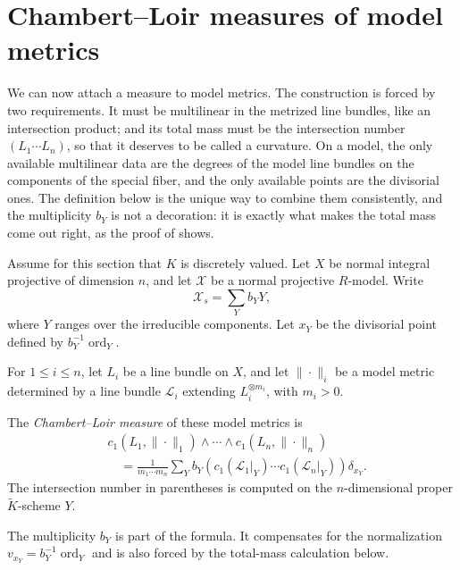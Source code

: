 \section{Chambert--Loir measures of model metrics}
\label{sec:metrics-cl-measure}

We can now attach a measure to model metrics. The construction is forced by
two requirements. It must be multilinear in the metrized line bundles, like
an intersection product; and its total mass must be the intersection number
$(L_1\cdots L_n)$, so that it deserves to be called a curvature. On a
model, the only available multilinear data are the degrees of the model line
bundles on the components of the special fiber, and the only available
points are the divisorial ones. The definition below is the unique way to
combine them consistently, and the multiplicity $b_Y$ is not a decoration:
it is exactly what makes the total mass come out right, as the proof of
 shows.

Assume for this section that $K$ is discretely valued. Let $X$ be
normal integral projective of dimension $n$, and let $\mathcal X$ be a normal
projective $R$-model. Write
\[
                        \mathcal X_s=\sum_Y b_YY,
\]
where $Y$ ranges over the irreducible components. Let $x_Y$ be the
divisorial point defined by $b_Y^{-1}\operatorname{ord}_Y$.

For $1\leq i\leq n$, let $L_i$ be a line bundle on $X$, and let
$\|\cdot\|_i$ be a model metric determined by a line bundle
$\mathcal L_i$ extending $L_i^{\otimes m_i}$, with $m_i>0$.

\begin{definition}
\label{def:metrics-mixed-model-measure}
The \emph{Chambert--Loir measure} of these model metrics is
\[
\begin{split}
 &c_1(L_1,\|\cdot\|_1)\wedge\cdots\wedge
                 c_1(L_n,\|\cdot\|_n)\\
 &\quad =
 \frac{1}{m_1\cdots m_n}
 \sum_Y b_Y
 \left(
 c_1(\mathcal L_1|_Y)\cdots c_1(\mathcal L_n|_Y)
 \right)\delta_{x_Y}.
\end{split}
\]
The intersection number in parentheses is computed on the
$n$-dimensional proper $\widetilde K$-scheme $Y$.
\end{definition}

The multiplicity $b_Y$ is part of the formula. It compensates for the
normalization $v_{x_Y}=b_Y^{-1}\operatorname{ord}_Y$ and is also forced by
the total-mass calculation below.

